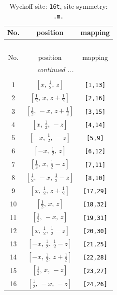 \documentclass[fleqn,8pt]{jsarticle}
\begin{document}
\renewcommand{\arraystretch}{1.2}
\begin{longtable}{ccc}
\caption{Wyckoff site: {\tt 16t}, site symmetry: {\tt .m.}}
 \\
 \hline \hline
No. & position & mapping \\ \hline \endfirsthead

\multicolumn{2}{l}{\tablename\ \thetable{}} \\
 \hline \hline
No. & position & mapping \\ \hline \endhead

 \hline \hline
\multicolumn{2}{r}{\footnotesize\it continued ...} \\ \endfoot

 \hline \hline
\multicolumn{2}{r}{} \\ \endlastfoot

1 & $\left[ x,\, \frac{1}{2},\, z \right]$ & {\tt [1,13]} \\ \hline
2 & $\left[ \frac{1}{2},\, x,\, z + \frac{1}{2} \right]$ & {\tt [2,16]} \\ \hline
3 & $\left[ \frac{1}{2},\, - x,\, z + \frac{1}{2} \right]$ & {\tt [3,15]} \\ \hline
4 & $\left[ x,\, \frac{1}{2},\, - z \right]$ & {\tt [4,14]} \\ \hline
5 & $\left[ - x,\, \frac{1}{2},\, - z \right]$ & {\tt [5,9]} \\ \hline
6 & $\left[ - x,\, \frac{1}{2},\, z \right]$ & {\tt [6,12]} \\ \hline
7 & $\left[ \frac{1}{2},\, x,\, \frac{1}{2} - z \right]$ & {\tt [7,11]} \\ \hline
8 & $\left[ \frac{1}{2},\, - x,\, \frac{1}{2} - z \right]$ & {\tt [8,10]} \\ \hline
9 & $\left[ x,\, \frac{1}{2},\, z + \frac{1}{2} \right]$ & {\tt [17,29]} \\ \hline
10 & $\left[ \frac{1}{2},\, x,\, z \right]$ & {\tt [18,32]} \\ \hline
11 & $\left[ \frac{1}{2},\, - x,\, z \right]$ & {\tt [19,31]} \\ \hline
12 & $\left[ x,\, \frac{1}{2},\, \frac{1}{2} - z \right]$ & {\tt [20,30]} \\ \hline
13 & $\left[ - x,\, \frac{1}{2},\, \frac{1}{2} - z \right]$ & {\tt [21,25]} \\ \hline
14 & $\left[ - x,\, \frac{1}{2},\, z + \frac{1}{2} \right]$ & {\tt [22,28]} \\ \hline
15 & $\left[ \frac{1}{2},\, x,\, - z \right]$ & {\tt [23,27]} \\ \hline
16 & $\left[ \frac{1}{2},\, - x,\, - z \right]$ & {\tt [24,26]} \\
\end{longtable}
\end{document}
